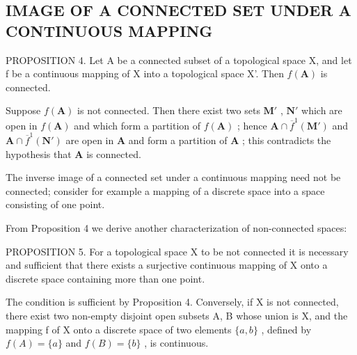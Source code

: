 \subsection{IMAGE OF A CONNECTED SET UNDER A CONTINUOUS MAPPING}

PROPOSITION 4. Let A be a connected subset of a topological space X, and let f be a continuous mapping of X into a topological space X'. Then \(f(\mathbf{A})\) is connected.

Suppose \(f(\mathbf{A})\) is not connected. Then there exist two sets \(\mathbf{M}'\) , \(\mathbf{N}'\) which are open in \(f(\mathbf{A})\) and which form a partition of \(f(\mathbf{A})\) ; hence \(\mathbf{A} \cap \overline{f}^{1}(\mathbf{M}')\) and \(\mathbf{A} \cap \overline{f}^{1}(\mathbf{N}')\) are open in \(\mathbf{A}\) and form a partition of \(\mathbf{A}\) ; this contradicts the hypothesis that \(\mathbf{A}\) is connected.

The inverse image of a connected set under a continuous mapping need not be connected; consider for example a mapping of a discrete space into a space consisting of one point.

From Proposition 4 we derive another characterization of non-connected spaces:

PROPOSITION 5. For a topological space X to be not connected it is necessary and sufficient that there exists a surjective continuous mapping of X onto a discrete space containing more than one point.

The condition is sufficient by Proposition 4. Conversely, if X is not connected, there exist two non-empty disjoint open subsets A, B whose union is X, and the mapping f of X onto a discrete space of two elements \(\{a, b\}\) , defined by \(f(A) = \{a\}\) and \(f(B) = \{b\}\) , is continuous.

